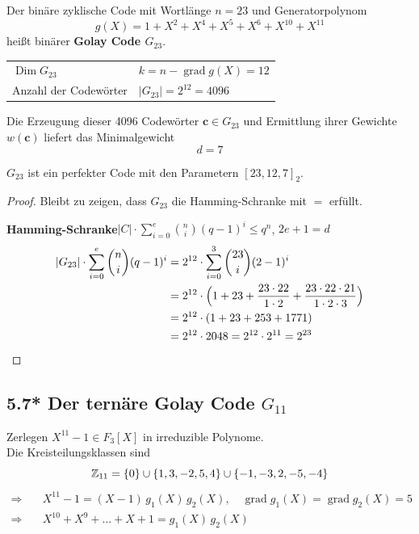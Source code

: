 \begin{definition}
Der binäre zyklische Code mit Wortlänge $n = 23$ und Generatorpolynom
\[
g(X) = 1 + X^2 + X^4 + X^5 + X^6 + X^{10} + X^{11}
\]
heißt binärer \textbf{Golay Code $G_{23}$}.
\end{definition}

\begin{tabular}{ll}
$\operatorname{Dim} G_{23}$ & $k = n - \operatorname{grad} g(X) = 12$ \\
Anzahl der Codewörter & $|G_{23}| = 2^{12} = 4096$
\end{tabular}

Die Erzeugung dieser 4096 Codewörter $\mathbf{c} \in G_{23}$ und Ermittlung ihrer Gewichte $w(\mathbf{c})$ liefert das Minimalgewicht
\[
d = 7
\]

\begin{satz}
$G_{23}$ ist ein perfekter Code mit den Parametern $[23, 12, 7]_2$.
\end{satz}

\begin{proof}
Bleibt zu zeigen, dass $G_{23}$ die Hamming-Schranke mit \glqq$=$\grqq{} erfüllt.

\textbf{Hamming-Schranke}\quad $|C| \cdot \displaystyle\sum_{i=0}^{e} \binom{n}{i} (q-1)^i \le q^n$, \quad $2e + 1 = d$
\begin{align*}
|G_{23}| \cdot \sum_{i=0}^{e} \binom{n}{i} (q-1)^i &= 2^{12} \cdot \sum_{i=0}^{3} \binom{23}{i} (2-1)^i \\
&= 2^{12} \cdot \Bigl(1 + 23 + \frac{23\cdot 22}{1\cdot 2} + \frac{23\cdot 22\cdot 21}{1\cdot 2\cdot 3}\Bigr) \\
&= 2^{12} \cdot (1 + 23 + 253 + 1771) \\
&= 2^{12} \cdot 2048 = 2^{12} \cdot 2^{11} = 2^{23} \qedhere
\end{align*}
\end{proof}

\subsection{5.7* Der ternäre Golay Code $G_{11}$}

Zerlegen $X^{11} - 1 \in F_3[X]$ in irreduzible Polynome.\\
Die Kreisteilungsklassen sind
\[
\mathbb{Z}_{11} = \{0\} \cup \{1, 3, -2, 5, 4\} \cup \{-1, -3, 2, -5, -4\}
\]
\begin{align*}
\Rightarrow\quad & X^{11} - 1 = (X - 1)\, g_1(X)\, g_2(X), \quad \operatorname{grad} g_1(X) = \operatorname{grad} g_2(X) = 5 \\
\Rightarrow\quad & X^{10} + X^9 + \dots + X + 1 = g_1(X)\, g_2(X)
\end{align*}

